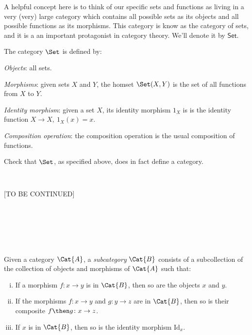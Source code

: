 A helpful concept here is to think of our specific sets and functions as living in a very (very) large category which contains all possible sets as its objects and all possible functions as its morphisms. This category is know as the category of sets, and it is a an important protagonist in category theory. We'll denote it by $\mathsf{Set}$. 

\begin{shaded}
\begin{definition}
    The category $\Set$ is defined by:
    \begin{compactenum}
    \item \emph{Objects}: all sets.
    \item \emph{Morphisms}: given sets $X$ and  $Y$, the homset $\Set(X,Y)$ is the set of all functions from $X$ to $Y$.
    \item \emph{Identity morphism}: given a set $X$, its identity morphism $\text{1}_X$ is 
    is the identity function $X \rightarrow X, \ \text{1}_X(x) = x$.
    \item \emph{Composition operation}: the composition operation is the usual composition of functions.
    \end{compactenum}
\end{definition}
\end{shaded}

\begin{exercise}
Check that $\Set$, as specified above, does in fact define a category. 
\end{exercise}

\


[TO BE CONTINUED]

\

\

\
\begin{shaded}
\begin{definition}[Subcategory]
\label{def:subcategory}
	Given a category $\Cat{A}$, a \emph{subcategory} $\Cat{B}$ consists of a subcollection of the collection of objects and morphisms of $\Cat{A}$ such that:
	\begin{enumerate}[(i)]
	\item If a morphism $f \colon x\to y$ is in $\Cat{B}$, then so are the objects $x$ and $y$.
	\item If the morphisms $f\colon x\to y$ and $g\colon y\to z$ are in $\Cat{B}$, then so is their composite $f\then g\colon x\to z$.
	\item If $x$ is in $\Cat{B}$, then so is the identity morphism $\text{Id}_x$.
	\end{enumerate}
\end{definition}
\end{shaded}

